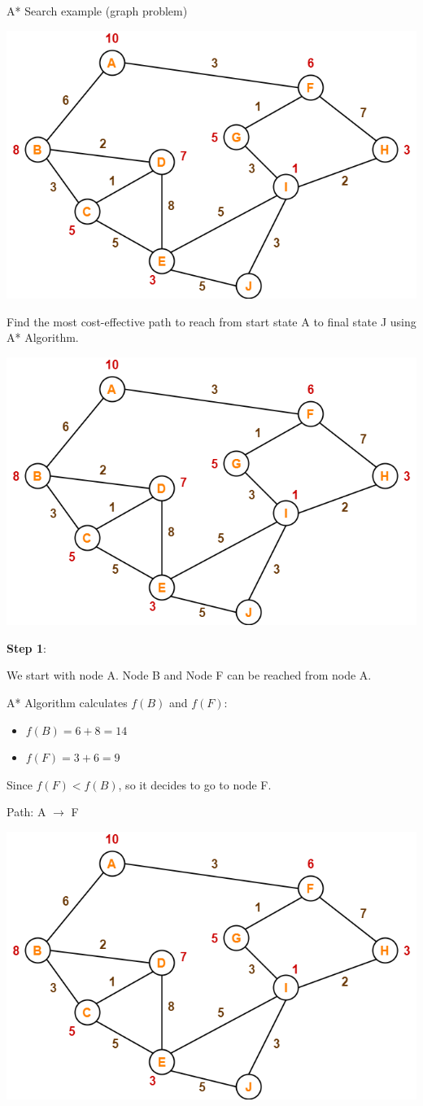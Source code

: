 \documentclass[9pt]{beamer}
\begin{document}
\begin{frame}{A* Search example (graph problem)}
\begin{small}

 {
\begin{center}
    \includegraphics[keepaspectratio, width=0.60\linewidth]{images/A-Algorithm-Problem-02.png}
\end{center}

Find the most cost-effective path to reach from start state A to final state J using A* Algorithm.
}

 {
\begin{center}
    \vspace{-0.5cm}
    \includegraphics[keepaspectratio, width=0.40\linewidth]{images/A-Algorithm-Problem-02.png}
\end{center}

\vspace{-1cm}

\textbf{Step 1}:

We start with node A. Node B and Node F can be reached from node A.

A* Algorithm calculates $f(B)$ and $f(F)$:
\begin{itemize}
    \item $f(B) = 6 + 8 = 14$
    \item $f(F) = 3 + 6 = 9$
\end{itemize}

Since $f(F) < f(B)$, so it decides to go to node F.

Path: \textcolor{CS-1}{A $\rightarrow$ F}
}

 {
\begin{center}
    \vspace{-0.5cm}
    \includegraphics[keepaspectratio, width=0.40\linewidth]{images/A-Algorithm-Problem-02.png}
\end{center}

}
\end{small}
\end{frame}
\end{document}
